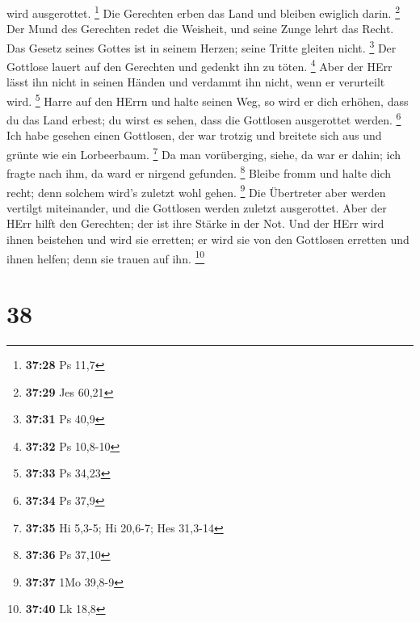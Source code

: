 wird ausgerottet. \footnote{\textbf{37:28} Ps 11,7}  Die
Gerechten erben das Land und bleiben ewiglich darin. \footnote{\textbf{37:29}
  Jes 60,21}  Der Mund des Gerechten redet die Weisheit,
und seine Zunge lehrt das Recht.  Das Gesetz seines Gottes
ist in seinem Herzen; seine Tritte gleiten nicht. \footnote{\textbf{37:31}
  Ps 40,9}  Der Gottlose lauert auf den Gerechten und
gedenkt ihn zu töten. \footnote{\textbf{37:32} Ps 10,8-10} 
Aber der HErr lässt ihn nicht in seinen Händen und verdammt ihn nicht,
wenn er verurteilt wird. \footnote{\textbf{37:33} Ps 34,23}
 Harre auf den HErrn und halte seinen Weg, so wird er dich
erhöhen, dass du das Land erbest; du wirst es sehen, dass die Gottlosen
ausgerottet werden. \footnote{\textbf{37:34} Ps 37,9}  Ich
habe gesehen einen Gottlosen, der war trotzig und breitete sich aus und
grünte wie ein Lorbeerbaum. \footnote{\textbf{37:35} Hi 5,3-5; Hi
  20,6-7; Hes 31,3-14}  Da man vorüberging, siehe, da war
er dahin; ich fragte nach ihm, da ward er nirgend gefunden. \footnote{\textbf{37:36}
  Ps 37,10}  Bleibe fromm und halte dich recht; denn
solchem wird's zuletzt wohl gehen. \footnote{\textbf{37:37} 1Mo 39,8-9}
 Die Übertreter aber werden vertilgt miteinander, und die
Gottlosen werden zuletzt ausgerottet.  Aber der HErr hilft
den Gerechten; der ist ihre Stärke in der Not.  Und der
HErr wird ihnen beistehen und wird sie erretten; er wird sie von den
Gottlosen erretten und ihnen helfen; denn sie trauen auf ihn.
\footnote{\textbf{37:40} Lk 18,8}

\hypertarget{section-16}{%
\section{38}\label{section-16}}

